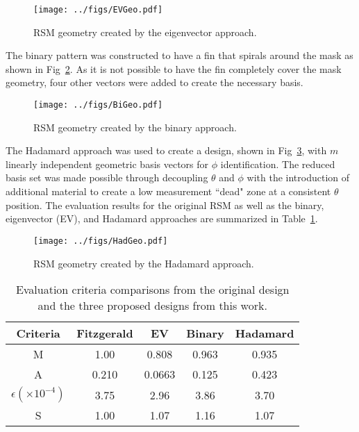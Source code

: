 \documentclass[twocolumn,10pt,final]{asme2ej}
\begin{document}
\vspace{-0.5 cm}
\begin{figure}[ht!]
\centering
\texttt{[image: ../figs/EVGeo.pdf]}
\caption{RSM geometry created by the eigenvector approach.}
\label{fig:EVGeo}
\end{figure}
\vspace{-0.5 cm}

The binary pattern was constructed to have a fin that spirals around the mask as shown in Fig~\ref{fig:BiGeo}.  
As it is not possible to have the fin completely cover the mask geometry, four other vectors were added to create the necessary basis. 

\vspace{-0.5 cm}
\begin{figure}[ht!]
\texttt{[image: ../figs/BiGeo.pdf]}
\centering
\caption{RSM geometry created by the binary approach.}
\label{fig:BiGeo}
\end{figure}
\vspace{-0.5 cm}

The Hadamard approach was used to create a design, shown in Fig~\ref{fig:HadGeo}, with $m$ linearly independent geometric basis vectors for $\phi$ identification.
The reduced basis set was made possible through decoupling $\theta$ and $\phi$ with the introduction of additional material to create a low measurement ``dead" zone at a consistent $\theta$ position.  
The evaluation results for the original RSM as well as the binary, eigenvector (EV), and Hadamard approaches are summarized in Table~\ref{table:results}.

\vspace{-0.5 cm}
\begin{figure}[ht!]
\centering
\texttt{[image: ../figs/HadGeo.pdf]}
\caption{RSM geometry created by the Hadamard approach.}
\label{fig:HadGeo}
\end{figure}
\vspace{-0.5 cm}
  
\vspace{-0.6 cm}
\begin{table}[ht]
\caption{Evaluation criteria comparisons from the original design and the three proposed designs from this work.} %
\centering %
\begin{tabular}{|c|c|c|c|c|} %
\hline
Criteria & Fitzgerald & EV & Binary & Hadamard\\
\hline
M & 1.00 & 0.808 & 0.963 & 0.935\\
\hline
A & 0.210 & 0.0663 & 0.125 & 0.423 \\
\hline
$\epsilon \left(\times 10^{-4}\right)$ & 3.75 & 2.96 & 3.86 & 3.70\\
\hline
S & 1.00 & 1.07 & 1.16 & 1.07 \\
\hline
\end{tabular}
\label{table:results} %
\end{table}
\vspace{-0.5 cm}
\end{document}
